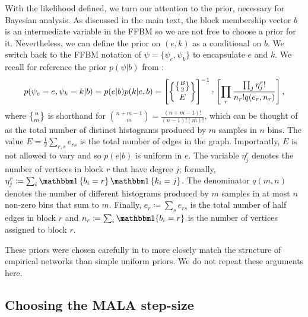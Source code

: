 With the likelihood defined, we turn our attention to the prior, necessary for Bayesian analysis. As discussed in the main text, the block membership vector $b$ is an intermediate variable in the FFBM so we are not free to choose a prior for it. Nevertheless, we can define the prior on $(e,k)$ as a conditional on $b$. We switch back to the FFBM notation of $\psi = \{\psi_e, \psi_k\}$ to encapsulate $e$ and $k$. We recall for reference
the prior $p(\psi | b)$ from \cite{Peixoto-Bayesian-Microcanonical}:
%
\begin{equation}
	p(\psi_e=e, \psi_k=k | b) = p(e | b) p(k | e, b) = \left[ \specialchoose{ \specialchoose{B}{2} }{ E} \right]^{-1} 
	\cdot \left[ \prod_r \frac{\prod_j \eta_j^r !}{n_r! q(e_r, n_r)} \right],
\end{equation}
%
where $\specialchoose{n}{m}$ is shorthand 
for $\binom{n+m-1}{m} = \frac{(n+m-1)!}{(n-1)!(m)!}$,
which can be thought of as the total number of distinct histograms 
produced by $m$ samples in $n$ bins.
The value
$E = \frac{1}{2} \sum_{r,s} e_{rs}$ is the total number of edges in the graph. 
Importantly, $E$ is not allowed to vary and so $p(e|b)$ is uniform in $e$.
The variable $\eta_j^r$ denotes the number of vertices in block $r$ 
that have degree $j$; formally, $\eta_j^r \coloneqq \sum_{i} \one\left\{b_i = r \right\} \one \left\{k_i = j \right\}$. 
The denominator $q(m, n)$ denotes the number of different histograms 
produced by $m$ samples in 
at most $n$ non-zero bins that sum to $m$. 
Finally, $e_r \coloneqq \sum_{s} e_{rs}$ is the total number 
of half edges in block $r$ and $n_r \coloneqq \sum_{i} \one\{b_i = r\}$ 
is the number of vertices assigned to block $r$. 

These priors were chosen carefully in \cite{Peixoto-Bayesian-Microcanonical} to 
more closely match the structure of empirical networks than simple 
uniform priors. We do not repeat these arguments here.

\subsection{Choosing the MALA step-size}
\label{appdx:step-size}

